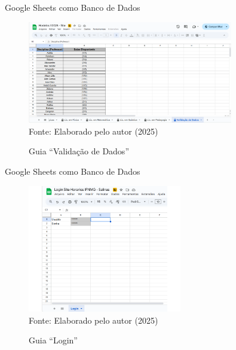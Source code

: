 \begin{frame}{Google Sheets como Banco de Dados}
    \begin{figure}
        \centering
        \vspace{-0.5cm}
        \caption{Guia ``Validação de Dados''}
        \vspace{-0.2cm}
        \includegraphics[width=0.8\textwidth]{figuras/plan-3.png}
        \\ %
        \small Fonte: Elaborado pelo autor (2025)
    \end{figure}
\end{frame}

\begin{frame}{Google Sheets como Banco de Dados}
    \begin{figure}
        \centering
        \vspace{-0.5cm}
        \caption{Guia ``Login''}
        \vspace{-0.2cm}
        \includegraphics[width=0.6\textwidth]{figuras/plan-4.png}
        \\ %
        \small Fonte: Elaborado pelo autor (2025)
    \end{figure}
\end{frame}

